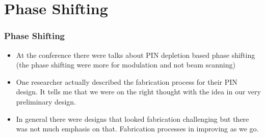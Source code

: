 \documentclass{beamer}
\begin{document}
\section{Phase Shifting} 
\begin{frame}
\frametitle{Phase Shifting}
\begin{itemize}
\item  At the conference there were talks about PIN depletion based phase shifting (the phase shifting were more for modulation and not beam scanning)
\item One researcher actually described the fabrication process for their PIN design. It tells me that we were on the right thought with the idea in our very preliminary design. 
\item In general there were designs that looked fabrication challenging but there was not much emphasis on that. Fabrication processes in improving as we go.
\end{itemize}
\end{frame}
\end{document}
